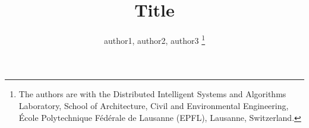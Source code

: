 \documentclass[journal]{IEEEtran}
\begin{document}

%
\title{Title}



\author{author1, author2, author3
\thanks{The authors are with the Distributed Intelligent Systems and Algorithms Laboratory, School of Architecture, Civil and Environmental Engineering, \'{E}cole Polytechnique F\'{e}d\'{e}rale de Lausanne (EPFL), Lausanne, Switzerland. 
}
}



\maketitle

\begin{abstract}


\end{abstract}









  

\end{document}
